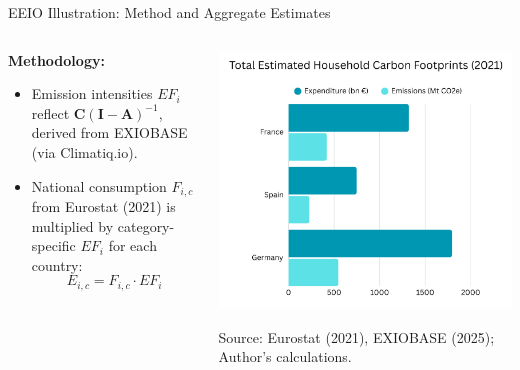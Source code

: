 \documentclass{beamer}
\begin{document}
\begin{frame}{EEIO Illustration: Method and Aggregate Estimates}
\vspace{-2.0em} %
\footnotesize

\begin{columns}[T] %
  \begin{column}{0.40\textwidth}
    \vspace{2.0em}
    \textbf{Methodology:}
    \begin{itemize}
      \item Emission intensities \(EF_i\) reflect \( \mathbf{C}(\mathbf{I}-\mathbf{A})^{-1} \), derived from EXIOBASE (via Climatiq.io).
      \item National consumption \(F_{i,c}\) from Eurostat (2021) is multiplied by category-specific \(EF_i\) for each country:
      \[
      E_{i,c} = F_{i,c} \cdot EF_i
      \]
    \end{itemize}
    
    
  \end{column}

  \begin{column}{0.60\textwidth}
    \centering
    \includegraphics[width=\linewidth]{EEIO Visual.png}

    \footnotesize Source: Eurostat (2021), EXIOBASE (2025); Author’s calculations.
  \end{column}
\end{columns}

\end{frame}
\end{document}

